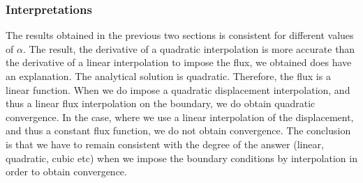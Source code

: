 \documentclass[a4paper,12pt]{article}
\begin{document}
\subsubsection{Interpretations}
The results obtained in the previous two sections is consistent for different values of $\alpha$. The result, the derivative of a quadratic interpolation is more accurate than the derivative of a linear interpolation to impose the flux, we obtained does have an explanation. The analytical solution is quadratic. Therefore, the flux is a linear function. When we do impose a quadratic displacement interpolation, and thus a linear flux interpolation on the boundary, we do obtain quadratic convergence. In the case, where we use a linear interpolation of the displacement, and thus a constant flux function, we do not obtain convergence. The conclusion is that we have to remain consistent with the degree of the answer (linear, quadratic, cubic etc) when we impose the boundary conditions by interpolation in order to obtain convergence.
\end{document}
